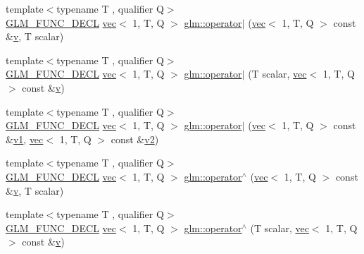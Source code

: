 \begin{DoxyCompactItemize}
\item 
{\footnotesize template$<$typename T , qualifier Q$>$ }\\\mbox{\hyperlink{setup_8hpp_ab2d052de21a70539923e9bcbf6e83a51}{G\+L\+M\+\_\+\+F\+U\+N\+C\+\_\+\+D\+E\+CL}} \mbox{\hyperlink{structglm_1_1vec}{vec}}$<$ 1, T, Q $>$ \mbox{\hyperlink{group__ext__vec1_ga4cb746ab6c11e1f5228e1468afcc0bfb}{glm\+::operator$\vert$}} (\mbox{\hyperlink{structglm_1_1vec}{vec}}$<$ 1, T, Q $>$ const \&\mbox{\hyperlink{_s_d_l__opengl_8h_a10a82eabcb59d2fcd74acee063775f90}{v}}, T scalar)
\item 
{\footnotesize template$<$typename T , qualifier Q$>$ }\\\mbox{\hyperlink{setup_8hpp_ab2d052de21a70539923e9bcbf6e83a51}{G\+L\+M\+\_\+\+F\+U\+N\+C\+\_\+\+D\+E\+CL}} \mbox{\hyperlink{structglm_1_1vec}{vec}}$<$ 1, T, Q $>$ \mbox{\hyperlink{group__ext__vec1_gaee2907e10f2307c2e36147741400da29}{glm\+::operator$\vert$}} (T scalar, \mbox{\hyperlink{structglm_1_1vec}{vec}}$<$ 1, T, Q $>$ const \&\mbox{\hyperlink{_s_d_l__opengl_8h_a10a82eabcb59d2fcd74acee063775f90}{v}})
\item 
{\footnotesize template$<$typename T , qualifier Q$>$ }\\\mbox{\hyperlink{setup_8hpp_ab2d052de21a70539923e9bcbf6e83a51}{G\+L\+M\+\_\+\+F\+U\+N\+C\+\_\+\+D\+E\+CL}} \mbox{\hyperlink{structglm_1_1vec}{vec}}$<$ 1, T, Q $>$ \mbox{\hyperlink{group__ext__vec1_ga837171e73bbc4fe6d067f275947f1b34}{glm\+::operator$\vert$}} (\mbox{\hyperlink{structglm_1_1vec}{vec}}$<$ 1, T, Q $>$ const \&\mbox{\hyperlink{_s_d_l__opengl__glext_8h_a435c176a02c061b43e19bdf7c86cceae}{v1}}, \mbox{\hyperlink{structglm_1_1vec}{vec}}$<$ 1, T, Q $>$ const \&\mbox{\hyperlink{_s_d_l__opengl__glext_8h_a0928f6d0f0f794ba000a21dfae422136}{v2}})
\item 
{\footnotesize template$<$typename T , qualifier Q$>$ }\\\mbox{\hyperlink{setup_8hpp_ab2d052de21a70539923e9bcbf6e83a51}{G\+L\+M\+\_\+\+F\+U\+N\+C\+\_\+\+D\+E\+CL}} \mbox{\hyperlink{structglm_1_1vec}{vec}}$<$ 1, T, Q $>$ \mbox{\hyperlink{group__ext__vec1_ga5e3dabaa97accd1e6cf3853326605d3e}{glm\+::operator$^\wedge$}} (\mbox{\hyperlink{structglm_1_1vec}{vec}}$<$ 1, T, Q $>$ const \&\mbox{\hyperlink{_s_d_l__opengl_8h_a10a82eabcb59d2fcd74acee063775f90}{v}}, T scalar)
\item 
{\footnotesize template$<$typename T , qualifier Q$>$ }\\\mbox{\hyperlink{setup_8hpp_ab2d052de21a70539923e9bcbf6e83a51}{G\+L\+M\+\_\+\+F\+U\+N\+C\+\_\+\+D\+E\+CL}} \mbox{\hyperlink{structglm_1_1vec}{vec}}$<$ 1, T, Q $>$ \mbox{\hyperlink{group__ext__vec1_gad8d8f5ba70c15af0a21dc1f79c2101b9}{glm\+::operator$^\wedge$}} (T scalar, \mbox{\hyperlink{structglm_1_1vec}{vec}}$<$ 1, T, Q $>$ const \&\mbox{\hyperlink{_s_d_l__opengl_8h_a10a82eabcb59d2fcd74acee063775f90}{v}})

\end{DoxyCompactItemize}
